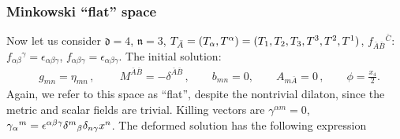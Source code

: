 \documentclass[12pt, utf8]{article}
\numberwithin{equation}{section}
\begin{document}
\subsubsection{Minkowski ``flat'' space}

Now let us consider $\mathfrak{d} = 4$, $\mathfrak{n} = 3$,  ${T}_{\bar{A}} = ({T}_\alpha,{T}^\alpha) = (T_1 , T_2, T_3, T^3, T^2, T^1) $, $f_{\bar{A}\bar{B}}{}^{\bar{C}}:$ $f_{\alpha \beta}{}^{\gamma} = \epsilon_{\alpha \beta \gamma}$, $f_{\alpha \beta \gamma} = \epsilon_{\alpha \beta \gamma}$. The initial solution: 
\begin{equation}
    \begin{aligned}
  &  g_{m n} = \eta_{mn} \, , \qquad\ M^{\bar{A}\bar{B}} = -\delta^{\bar{A}\bar{B}} \, ,  \qquad b_{mn} = 0, \qquad A_{m \bar{A}} = 0 \, ,  \qquad \phi = \frac{x_4}{2}.
    \end{aligned}
\end{equation}
Again, we refer to this space as ``flat'', despite the nontrivial dilaton, since the metric and scalar fields are trivial. Killing vectors are $\gamma^{\alpha m} = 0$, $\gamma_{\alpha}{}^{m} = \epsilon^{\alpha \beta \gamma} \delta^{m}{}_{\beta} \delta_{n \gamma} x^{n}$. The deformed solution has the following expression
\end{document}
